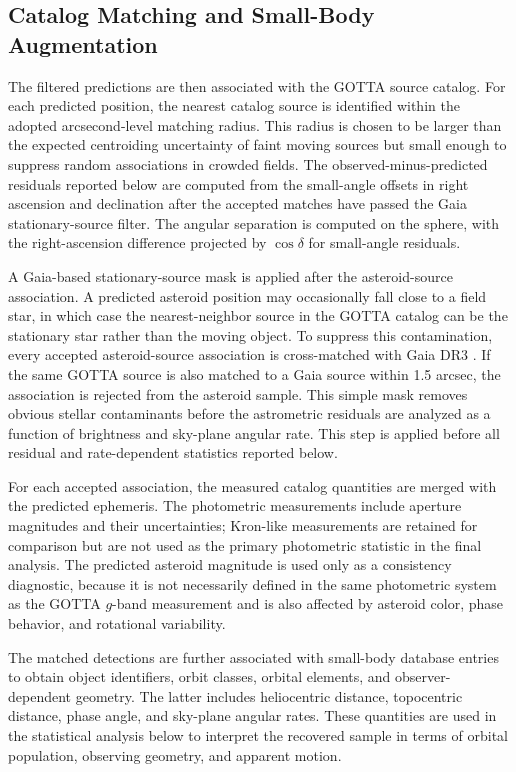 \documentclass[referee]{raa}
\begin{document}
\subsection{Catalog Matching and Small-Body Augmentation}

The filtered predictions are then associated with the GOTTA source catalog. For each predicted position, the nearest catalog source is identified within the adopted arcsecond-level matching radius. This radius is chosen to be larger than the expected centroiding uncertainty of faint moving sources but small enough to suppress random associations in crowded fields. The observed-minus-predicted residuals reported below are computed from the small-angle offsets in right ascension and declination after the accepted matches have passed the Gaia stationary-source filter. The angular separation is computed on the sphere, with the right-ascension difference projected by \(\cos\delta\) for small-angle residuals.

A Gaia-based stationary-source mask is applied after the asteroid-source association. A predicted asteroid position may occasionally fall close to a field star, in which case the nearest-neighbor source in the GOTTA catalog can be the stationary star rather than the moving object. To suppress this contamination, every accepted asteroid-source association is cross-matched with Gaia DR3 \citep{Gaia2023}. If the same GOTTA source is also matched to a Gaia source within 1.5 arcsec, the association is rejected from the asteroid sample. This simple mask removes obvious stellar contaminants before the astrometric residuals are analyzed as a function of brightness and sky-plane angular rate. This step is applied before all residual and rate-dependent statistics reported below.

For each accepted association, the measured catalog quantities are merged with the predicted ephemeris. The photometric measurements include aperture magnitudes and their uncertainties; Kron-like measurements are retained for comparison but are not used as the primary photometric statistic in the final analysis. The predicted asteroid magnitude is used only as a consistency diagnostic, because it is not necessarily defined in the same photometric system as the GOTTA $g$-band measurement and is also affected by asteroid color, phase behavior, and rotational variability.

The matched detections are further associated with small-body database entries to obtain object identifiers, orbit classes, orbital elements, and observer-dependent geometry. The latter includes heliocentric distance, topocentric distance, phase angle, and sky-plane angular rates. These quantities are used in the statistical analysis below to interpret the recovered sample in terms of orbital population, observing geometry, and apparent motion.
\end{document}
